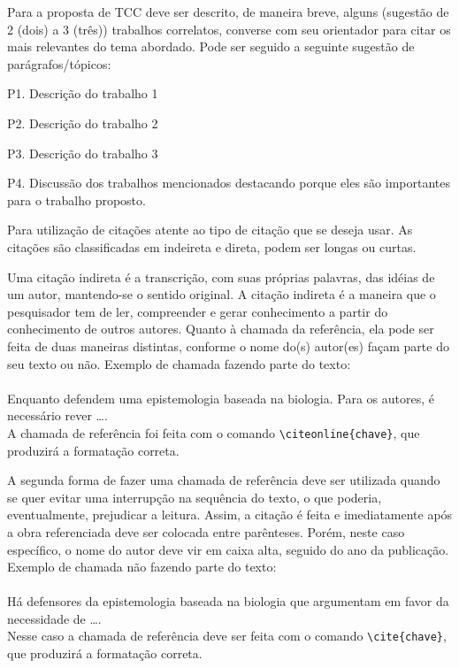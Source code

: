 Para a proposta de TCC deve ser descrito, de maneira breve, alguns (sugestão de 2 (dois) a 3 (três)) trabalhos correlatos, converse com seu orientador para citar os mais relevantes do tema abordado. Pode ser seguido a seguinte sugestão de parágrafos/tópicos:

P1. Descrição do trabalho 1

P2. Descrição do trabalho 2

P3. Descrição do trabalho 3

P4. Discussão dos trabalhos mencionados destacando porque eles são importantes para o trabalho proposto.

Para utilização de citações atente ao tipo de citação que se deseja usar. As citações são classificadas em indeireta e direta, podem ser longas ou curtas.

Uma citação indireta é a transcrição, com suas próprias palavras, das idéias de um autor, mantendo-se o sentido original. A citação indireta é a maneira que o pesquisador tem de ler, compreender e gerar conhecimento a partir do conhecimento de outros autores. Quanto à chamada da referência, ela pode ser feita de duas maneiras distintas, conforme o nome do(s) autor(es) façam parte do seu texto ou não. Exemplo de chamada fazendo parte do texto:\\
\\Enquanto {} defendem uma epistemologia baseada na biologia. Para os autores, é necessário rever \ldots.\\

A chamada de referência foi feita com o comando \verb|\citeonline{chave}|, que produzirá a formatação correta.

A segunda forma de fazer uma chamada de referência deve ser utilizada quando se quer evitar uma interrupção na sequência do texto, o que poderia, eventualmente, prejudicar a leitura. Assim, a citação é feita e imediatamente após a obra referenciada deve ser colocada entre parênteses. Porém, neste caso específico, o nome do autor deve vir em caixa alta, seguido do ano da publicação. Exemplo de chamada não fazendo parte do texto:\\
\\Há defensores da epistemologia baseada na biologia que argumentam em favor da necessidade de \ldots \cite{Maturana2003}.\\

Nesse caso a chamada de referência deve ser feita com o comando \verb|\cite{chave}|, que produzirá a formatação correta.

